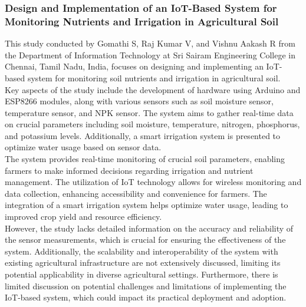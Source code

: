 \documentclass[12pt, a4paper]{article}
\begin{document}
\subsubsection{Design and Implementation of an IoT-Based System for Monitoring Nutrients and Irrigation in Agricultural Soil}
This study conducted by Gomathi S, Raj Kumar V, and Vishnu Aakash R\cite{gomathi2022design}  from the Department of Information Technology at Sri Sairam Engineering College in Chennai, Tamil Nadu, India, focuses on designing and implementing an IoT-based system for monitoring soil nutrients and irrigation in agricultural soil.\\
Key aspects of the study include the development of hardware using Arduino and ESP8266 modules, along with various sensors such as soil moisture sensor, temperature sensor, and NPK sensor. The system aims to gather real-time data on crucial parameters including soil moisture, temperature, nitrogen, phosphorus, and potassium levels. Additionally, a smart irrigation system is presented to optimize water usage based on sensor data.\\
The system provides real-time monitoring of crucial soil parameters, enabling farmers to make informed decisions regarding irrigation and nutrient management. The utilization of IoT technology allows for wireless monitoring and data collection, enhancing accessibility and convenience for farmers. The integration of a smart irrigation system helps optimize water usage, leading to improved crop yield and resource efficiency.\\
However, the study lacks detailed information on the accuracy and reliability of the sensor measurements, which is crucial for ensuring the effectiveness of the system. Additionally, the scalability and interoperability of the system with existing agricultural infrastructure are not extensively discussed, limiting its potential applicability in diverse agricultural settings. Furthermore, there is limited discussion on potential challenges and limitations of implementing the IoT-based system, which could impact its practical deployment and adoption.
\end{document}
